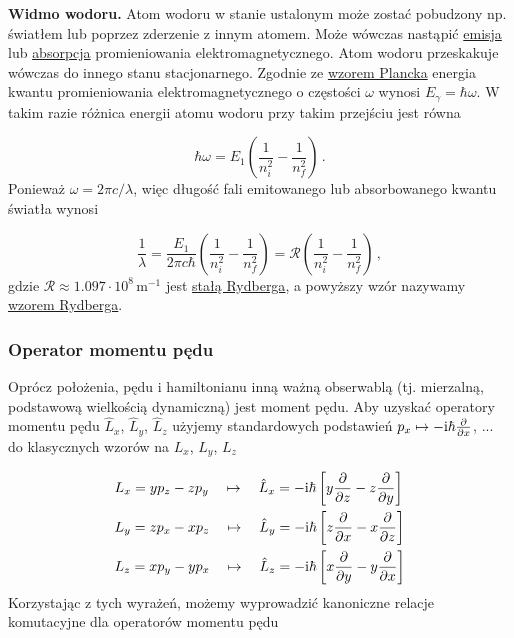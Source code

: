 \documentclass{myclass}
\begin{document}
\textbf{Widmo wodoru.} Atom wodoru w stanie ustalonym może zostać pobudzony np. światłem lub poprzez
zderzenie z innym atomem. Może wówczas nastąpić \underline{emisja} lub \underline{absorpcja}
promieniowania elektromagnetycznego. Atom wodoru przeskakuje wówczas do innego stanu stacjonarnego.
Zgodnie ze \underline{wzorem Plancka} energia kwantu promieniowania elektromagnetycznego o częstości
\(\omega\) wynosi \(E_\gamma=\hbar\omega\). W takim razie różnica energii atomu wodoru przy takim
przejściu jest równa

\begin{equation*}
    \hbar\omega=E_1\left(\frac{1}{n_i^2}-\frac{1}{n_f^2}\right)\,.
\end{equation*}
Ponieważ \(\omega=2\pi c/\lambda\), więc długość fali emitowanego lub absorbowanego kwantu światła
wynosi

\begin{equation*}
    \frac{1}{\lambda}=\frac{E_1}{2\pi c\hbar}\left(\frac{1}{n_i^2}-\frac{1}{n_f^2}\right)=\mathcal{R}\left(\frac{1}{n_i^2}-\frac{1}{n_f^2}\right)\,,
\end{equation*}
gdzie \(\mathcal{R}\approx1.097\cdot10^8\,\text{m}^{-1}\) jest \underline{stałą Rydberga}, a
powyższy wzór nazywamy \underline{wzorem Rydberga}.

\subsubsection{Operator momentu pędu}

Oprócz położenia, pędu i hamiltonianu inną ważną obserwablą (tj. mierzalną, podstawową wielkością
dynamiczną) jest moment pędu. Aby uzyskać operatory momentu pędu \(\hat{L}_x\), \(\hat{L}_y\),
\(\hat{L}_z\) użyjemy standardowych podstawień \(p_x\mapsto-\mathrm{i}\hbar\pdv{ }{x}\), ... do klasycznych
wzorów na \(L_x\), \(L_y\), \(L_z\)

\begin{equation*}
    \begin{split}
        &L_x=yp_z-zp_y\quad\mapsto\quad\hat{L}_x=-\mathrm{i}\hbar\left[y\pdv{ }{z}-z\pdv{ }{y}\right]\\
        &L_y=zp_x-xp_z\quad\mapsto\quad\hat{L}_y=-\mathrm{i}\hbar\left[z\pdv{ }{x}-x\pdv{ }{z}\right]\\
        &L_z=xp_y-yp_x\quad\mapsto\quad\hat{L}_z=-\mathrm{i}\hbar\left[x\pdv{ }{y}-y\pdv{ }{x}\right]
    \end{split}
\end{equation*}
Korzystając z tych wyrażeń, możemy wyprowadzić kanoniczne relacje komutacyjne dla operatorów momentu
pędu
\end{document}
